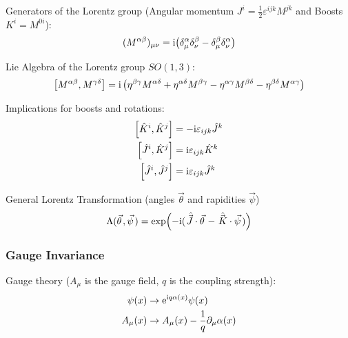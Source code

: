 			\noindent
			Generators of the Lorentz group (Angular momentum $J^i = \frac{1}{2}\varepsilon^{ijk} M^{jk}$ and Boosts $K^i = M^{0i}$):
			\begin{equation}
				\begin{aligned}
					(M^{\alpha\beta})_{\mu\nu} &= \mathrm{i}\qty(\delta^{\alpha}_{\mu}\delta^{\beta}_{\nu} - \delta^{\beta}_{\mu}\delta^{\alpha}_\nu ) \\
				\end{aligned}
			\end{equation}
		
			\noindent
			Lie Algebra of the Lorentz group $SO(1,3)$:
			\begin{equation}
				\begin{aligned}
					\comm{M^{\alpha\beta}}{M^{\gamma\delta}} = \i \left(\eta^{\beta\gamma}M^{\alpha\delta}+\eta^{\alpha\delta}M^{\beta\gamma}-\eta^{\alpha\gamma}M^{\beta\delta}-\eta^{\beta\delta}M^{\alpha\gamma}\right)
				\end{aligned}
			\end{equation}
		
			\noindent
			Implications for boosts and rotations:
			\begin{equation}
				\begin{aligned}
					\comm{\hat{K}^i}{\hat{K}^j} &= -\i \levicivita{ijk}\hat{J}^k \\
					\comm{\hat{J}^i}{\hat{K}^j} &= \i \levicivita{ijk}\hat{K}^k \\
					\comm{\hat{J}^i}{\hat{J}^j} &= \i \levicivita{ijk}\hat{J}^k \\
				\end{aligned}				
			\end{equation}
		
			\noindent
			General Lorentz Transformation (angles $\vec{\theta}$ and rapidities $\vec{\psi}$)
			\begin{equation}
				\label{Eq:GeneralLorentzTransformation}
				\Lambda(\vec{\theta}, \vec{\psi}) = \exp(-\i(\hat{\vec{J}}\cdot\vec{\theta} - \hat{\vec{K}}\cdot\vec{\psi}))
			\end{equation}
		
		\subsubsection{Gauge Invariance}
			Gauge theory ($A_\mu$ is the gauge field, $q$ is the coupling strength):
			\begin{equation}
				\begin{aligned}
					\psi(x) &\rightarrow \mathrm{e}^{\mathrm{i} q \alpha(x)}\psi(x) \\
					A_\mu(x) &\rightarrow A_\mu(x) - \frac{1}{q}\partial_\mu\alpha(x) \\
				\end{aligned}
			\end{equation}

